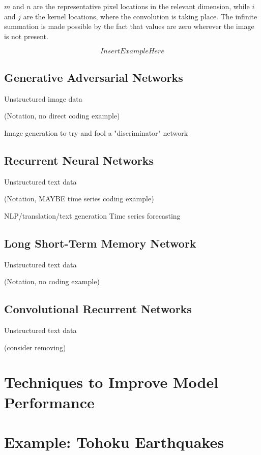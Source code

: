 $m$ and $n$ are the representative pixel locations in the relevant dimension, while $i$ and $j$ are the kernel locations, where the convolution is taking place.  The infinite summation is made possible by the fact that values are zero wherever the image is not present.



$$
Insert Example Here
$$



\subsection{Generative Adversarial Networks}
Unstructured image data

(Notation, no direct coding example)

Image generation to try and fool a "discriminator" network

\subsection{Recurrent Neural Networks}
Unstructured text data

(Notation, MAYBE time series coding example)

NLP/translation/text generation
Time series forecasting

\subsection{Long Short-Term Memory Network}
Unstructured text data

(Notation, no coding example)

\subsection{Convolutional Recurrent Networks}
Unstructured text data

(consider removing)

\section{Techniques to Improve Model Performance} %



\section{Example: Tohoku Earthquakes} %





